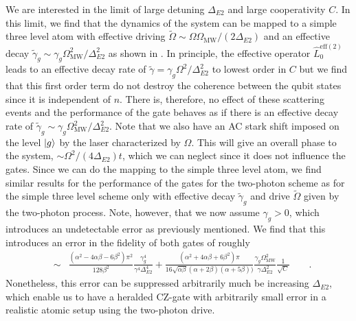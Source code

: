 We are interested in the limit of large detuning $\Delta_{E2}$ and large
cooperativity $C$. In this limit, we find that the dynamics of the system can be
mapped to a simple three level atom with effective driving
$\tilde{\Omega}\sim\Omega\Omega_{\text{MW}}/(2\Delta_{E2})$ and an effective
decay $\tilde{\gamma}_{g}\sim\gamma_{g}\Omega_{\text{MW}}^{2}/\Delta_{E2}^{2}$
as shown in . In principle, the effective operator
$\hat{L}_{0}^{\text{eff}(2)}$ leads to an effective decay rate of
$\tilde{\gamma}=\gamma_{g}\Omega^{2}/\Delta_{E2}^{2}$ to lowest order in $C$ 
but we find that this first order term do not destroy the coherence between the
qubit states since it is independent of $n$. There is, therefore, no effect of
these scattering events and the performance of the gate behaves as if there is
an effective decay rate of
$\tilde{\gamma}_{g}\sim\gamma_{g}\Omega_{\text{MW}}^{2}/\Delta_{E2}^{2}$. Note
that we also have an AC stark shift imposed on the level $| g \rangle$ by the laser
characterized by $\Omega$. This will give an overall phase to the system,
$\sim\Omega^{2}/(4\Delta_{E2})t$, which we can neglect since it does not
influence the gates.
Since we can do the mapping to the simple three level atom, we find similar
results for the performance of the gates for the two-photon scheme as for the
simple three level scheme only with effective decay $\tilde{\gamma}_{g}$ and
drive $\tilde{\Omega}$ given by the two-photon process. Note, however, that we
now assume $\gamma_{g}>0$, which introduces an undetectable error as previously
mentioned. We find that this introduces an error in the fidelity of both gates
of roughly
\begin{eqnarray}
&\sim&\frac{(\alpha^{2}-4\alpha\beta-6\beta^{2})\pi^{2}}{128\beta^{2}}\frac{\gamma_{g}^{4}}{\gamma^{4}\Delta_{E2}^{4}}+\frac{(\alpha^{2}+4\alpha\beta+6\beta^{2})\pi}{16\sqrt{\alpha\beta}(\alpha+2\beta)(\alpha+5\beta))}\frac{\gamma_{g}\Omega_{\text{MW}}^{2}}{\gamma\Delta_{E2}^{2}}\frac{1}{\sqrt{C}}\qquad.
\end{eqnarray}  
Nonetheless, this error can be suppressed arbitrarily much be increasing
$\Delta_{E2}$, which enable us to have a heralded CZ-gate with arbitrarily small
error in a realistic atomic setup using the two-photon drive.

